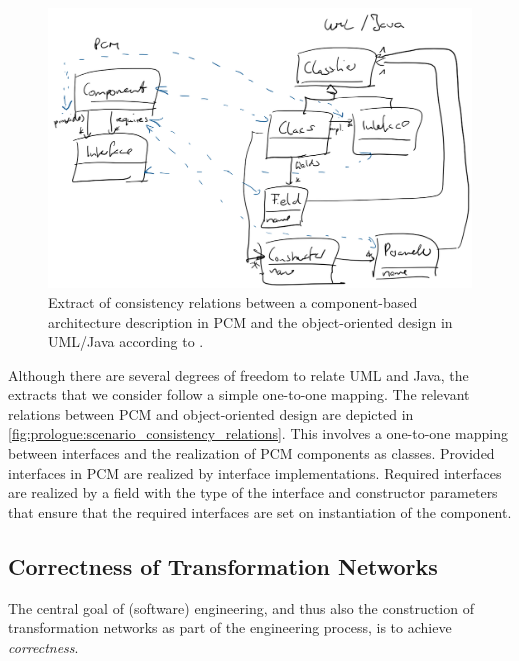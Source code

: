 \begin{figure}
    \centering
    \includegraphics[width=\textwidth]{figures/prologue/scenario_consistency_relations.png}
    \caption[Consistency relation for \acrshort{PCM} and \gls{UML}/Java]{Extract of consistency relations between a component-based architecture description in \gls{PCM} and the object-oriented design in \gls{UML}/Java according to \cite{langhammer2017a}.}
    \label{fig:prologue:scenario_consistency_relations}
\end{figure}

Although there are several degrees of freedom to relate \gls{UML} and Java, the extracts that we consider follow a simple one-to-one mapping.
The relevant relations between \gls{PCM} and object-oriented design are depicted in \autoref{fig:prologue:scenario_consistency_relations}.
This involves a one-to-one mapping between interfaces and the realization of \gls{PCM} components as classes. 
Provided interfaces in \gls{PCM} are realized by interface implementations. 
Required interfaces are realized by a field with the type of the interface and constructor parameters that ensure that the required interfaces are set on instantiation of the component.

\subsection{Correctness of Transformation Networks}

The central goal of (software) engineering, and thus also the construction of transformation networks as part of the engineering process, is to achieve \emph{correctness}.

